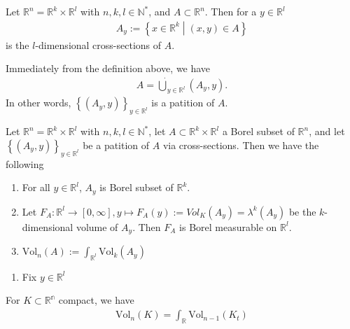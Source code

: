 \begin{definition}
    Let \(\mathbb{R}^n = \mathbb{R}^k \times \mathbb{R}^l\) with \(n, k, l \in \mathbb{N}^*\), and \(A \subset \mathbb{R}^n\). Then for a \(y \in \mathbb{R}^l\)
    \begin{align}
        A_y := \left\{ x \in \mathbb{R}^k \middle| (x, y) \in A \right\}
    \end{align}
    is the \(l\)-dimensional cross-sections of \(A\).
\end{definition}
\begin{remark}
    Immediately from the definition above, we have
    \begin{align}
        A = \dot\bigcup_{y \in \mathbb{R}^l}(A_y, y) \text{.}
    \end{align}
    In other words, \( \left\{(A_y, y)\right\}_{y \in \mathbb{R}^l}\) is a patition of \(A\).
\end{remark}
\begin{theorem}
    Let \(\mathbb{R}^n = \mathbb{R}^k \times \mathbb{R}^l\) with \(n, k, l \in \mathbb{N}^*\), let \(A \subset \mathbb{R}^k \times \mathbb{R}^l\) a Borel subset of \(\mathbb{R}^n\), and let \( \left\{(A_y, y)\right\}_{y \in \mathbb{R}^l}\) be a patition of \(A\) via cross-sections. Then we have the following
    \begin{enumerate}
        \item For all \(y \in \mathbb{R}^l\), \(A_y\) is Borel subset of \(\mathbb{R}^k\).
        \item Let \(F_A: \mathbb{R}^l \rightarrow [0, \infty], y \mapsto F_A(y) := Vol_K(A_y) = \lambda^k (A_y)\) be the \(k\)-dimensional volume of \(A_y\). Then \(F_A\) is Borel measurable on \(\mathbb{R}^l\).
        \item \(\text{Vol}_n(A) := \int_{\mathbb{R}^l} \text{Vol}_k (A_y)\)
    \end{enumerate}
\end{theorem}
\proof
\begin{enumerate}
    \item Fix \(y \in \mathbb{R}^l\)
\end{enumerate}
\begin{theorem}
    For \(K \subset \mathbb{R^n}\) compact, we have
    \begin{align}
        \text{Vol}_n (K) = \int_{\mathbb{R}} \text{Vol}_{n-1}(K_t)
    \end{align}
\end{theorem}
%
